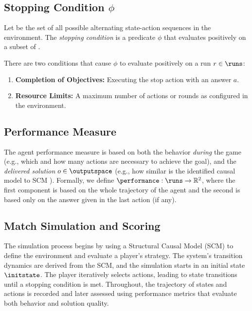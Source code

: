 \documentclass{article}
\begin{document}
    \subsection{Stopping Condition $\phi$}
        Let \runs be the set of all possible alternating state-action sequences in the environment.
        The \emph{stopping condition} is a predicate $\phi$ that evaluates positively on a subset of \runs.
    
        There are two conditions that cause $\phi$ to evaluate positively on a run $r \in \runs$:

        \begin{enumerate}
            \item \textbf{Completion of Objectives:} Executing the stop action with an answer $a$.
            \item \textbf{Resource Limits:} A maximum number of actions or rounds as configured in the environment.
        \end{enumerate}



    \subsection{Performance Measure}
        The agent performance measure \performance is based on both the behavior \emph{during} the game (e.g., which and how many actions are necessary to achieve the goal), and the \emph{delivered solution} $o \in \outputspace$ (e.g., how similar is the identified causal model to SCM \scm).
        Formally, we define $\performance: \runs \rightarrow \mathbb{R}^2$, where the first component is based on the whole trajectory of the agent and the second is based only on the answer given in the last action (if any).



    \subsection{Match Simulation and Scoring}
        The simulation process begins by using a Structural Causal Model (SCM) to define the environment and evaluate a player’s strategy. 
        The system’s transition dynamics are derived from the SCM, and the simulation starts in an initial state $\initstate$. 
        The player iteratively selects actions, leading to state transitions until a stopping condition is met. 
        Throughout, the trajectory of states and actions is recorded and later assessed using performance metrics that evaluate both behavior and solution quality.
\end{document}
